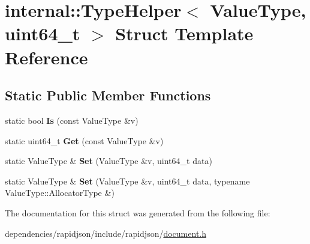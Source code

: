 \hypertarget{structinternal_1_1_type_helper_3_01_value_type_00_01uint64__t_01_4}{}\section{internal\+:\+:Type\+Helper$<$ Value\+Type, uint64\+\_\+t $>$ Struct Template Reference}
\label{structinternal_1_1_type_helper_3_01_value_type_00_01uint64__t_01_4}
\subsection*{Static Public Member Functions}
\begin{DoxyCompactItemize}
\item 
\mbox{\label{structinternal_1_1_type_helper_3_01_value_type_00_01uint64__t_01_4_a4916651732ed27fa944c96a32cec5b88}} 
static bool {\bfseries Is} (const Value\+Type \&v)
\item 
\mbox{\label{structinternal_1_1_type_helper_3_01_value_type_00_01uint64__t_01_4_a1b1b2e4fe3c38fb37701284c6571ee92}} 
static uint64\+\_\+t {\bfseries Get} (const Value\+Type \&v)
\item 
\mbox{\label{structinternal_1_1_type_helper_3_01_value_type_00_01uint64__t_01_4_a38392035fe5a647078b24f0e15a84145}} 
static Value\+Type \& {\bfseries Set} (Value\+Type \&v, uint64\+\_\+t data)
\item 
\mbox{\label{structinternal_1_1_type_helper_3_01_value_type_00_01uint64__t_01_4_a3c8b01c3e9a9e63c99bef2db9fdf3823}} 
static Value\+Type \& {\bfseries Set} (Value\+Type \&v, uint64\+\_\+t data, typename Value\+Type\+::\+Allocator\+Type \&)
\end{DoxyCompactItemize}


The documentation for this struct was generated from the following file\+:\begin{DoxyCompactItemize}
\item 
dependencies/rapidjson/include/rapidjson/\hyperlink{document_8h}{document.\+h}\end{DoxyCompactItemize}
